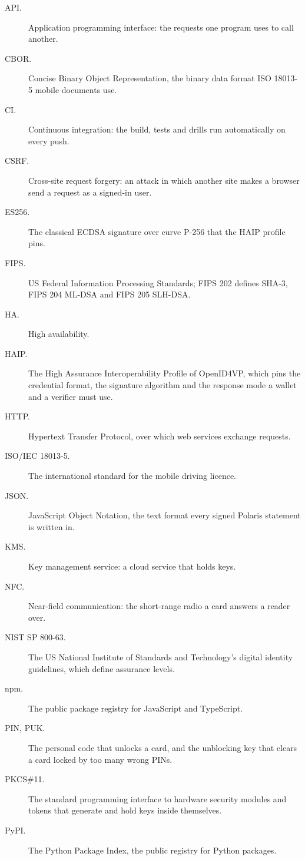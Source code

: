 \begin{description}
  \item[API.] Application programming interface: the requests one program uses to call another.
  \item[CBOR.] Concise Binary Object Representation, the binary data format ISO 18013-5 mobile documents use.
  \item[CI.] Continuous integration: the build, tests and drills run automatically on every push.
  \item[CSRF.] Cross-site request forgery: an attack in which another site makes a browser send a request as a signed-in user.
  \item[ES256.] The classical ECDSA signature over curve P-256 that the HAIP profile pins.
  \item[FIPS.] US Federal Information Processing Standards; FIPS 202 defines SHA-3, FIPS 204 ML-DSA and FIPS 205 SLH-DSA.
  \item[HA.] High availability.
  \item[HAIP.] The High Assurance Interoperability Profile of OpenID4VP, which pins the credential format, the signature algorithm and the response mode a wallet and a verifier must use.
  \item[HTTP.] Hypertext Transfer Protocol, over which web services exchange requests.
  \item[ISO/IEC 18013-5.] The international standard for the mobile driving licence.
  \item[JSON.] JavaScript Object Notation, the text format every signed Polaris statement is written in.
  \item[KMS.] Key management service: a cloud service that holds keys.
  \item[NFC.] Near-field communication: the short-range radio a card answers a reader over.
  \item[NIST SP 800-63.] The US National Institute of Standards and Technology's digital identity guidelines, which define assurance levels.
  \item[npm.] The public package registry for JavaScript and TypeScript.
  \item[PIN, PUK.] The personal code that unlocks a card, and the unblocking key that clears a card locked by too many wrong PINs.
  \item[PKCS\#11.] The standard programming interface to hardware security modules and tokens that generate and hold keys inside themselves.
  \item[PyPI.] The Python Package Index, the public registry for Python packages.

\end{description}
